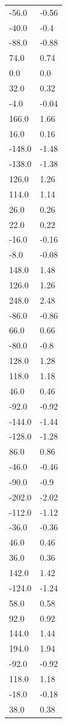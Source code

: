 \begin{longtable}{ll}
-56.0 & -0.56 \\
-40.0 & -0.4 \\
-88.0 & -0.88 \\
74.0 & 0.74 \\
0.0 & 0.0 \\
32.0 & 0.32 \\
-4.0 & -0.04 \\
166.0 & 1.66 \\
16.0 & 0.16 \\
-148.0 & -1.48 \\
-138.0 & -1.38 \\
126.0 & 1.26 \\
114.0 & 1.14 \\
26.0 & 0.26 \\
22.0 & 0.22 \\
-16.0 & -0.16 \\
-8.0 & -0.08 \\
148.0 & 1.48 \\
126.0 & 1.26 \\
248.0 & 2.48 \\
-86.0 & -0.86 \\
66.0 & 0.66 \\
-80.0 & -0.8 \\
128.0 & 1.28 \\
118.0 & 1.18 \\
46.0 & 0.46 \\
-92.0 & -0.92 \\
-144.0 & -1.44 \\
-128.0 & -1.28 \\
86.0 & 0.86 \\
-46.0 & -0.46 \\
-90.0 & -0.9 \\
-202.0 & -2.02 \\
-112.0 & -1.12 \\
-36.0 & -0.36 \\
46.0 & 0.46 \\
36.0 & 0.36 \\
142.0 & 1.42 \\
-124.0 & -1.24 \\
58.0 & 0.58 \\
92.0 & 0.92 \\
144.0 & 1.44 \\
194.0 & 1.94 \\
-92.0 & -0.92 \\
118.0 & 1.18 \\
-18.0 & -0.18 \\
38.0 & 0.38 \\

\end{longtable}
